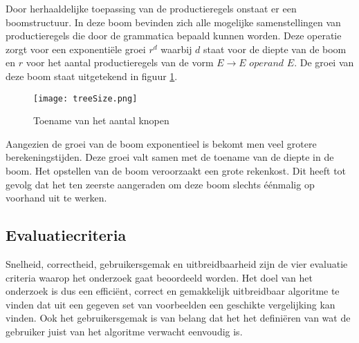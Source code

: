\documentclass[Main.tex]{subfiles}
\begin{document}
Door herhaaldelijke toepassing van de productieregels onstaat er een boomstructuur. In deze boom bevinden zich alle mogelijke samenstellingen van productieregels die door de grammatica bepaald kunnen worden. Deze operatie zorgt voor een exponenti\"ele groei $r^{d}$ waarbij $d$ staat voor de diepte van de boom en $r$ voor het aantal productieregels van de vorm $E \rightarrow E$  $operand$ $ E$. De groei van deze boom staat uitgetekend in figuur \ref{fig:treeSize}.

\begin{figure}[!htb]
\centering
\texttt{[image: treeSize.png]}
\caption{Toename van het aantal knopen}
\label{fig:treeSize}
\end{figure}
Aangezien de groei van de boom exponentieel is bekomt men veel grotere berekeningstijden. Deze groei valt samen met de toename van de diepte in de boom. Het opstellen van de boom veroorzaakt een grote rekenkost. Dit heeft tot gevolg dat het ten zeerste aangeraden om deze boom slechts \'e\'enmalig op voorhand uit te werken.

\subsection{Evaluatiecriteria}

Snelheid, correctheid, gebruikersgemak en uitbreidbaarheid zijn de vier evaluatie criteria waarop het onderzoek gaat beoordeeld worden. Het doel van het onderzoek is dus een effici\"ent, correct en gemakkelijk uitbreidbaar algoritme te vinden dat uit een gegeven set van voorbeelden een geschikte vergelijking kan vinden. Ook het gebruikersgemak is van belang dat het het defini\"eren van wat de gebruiker juist van het algoritme verwacht eenvoudig is.
\end{document}
